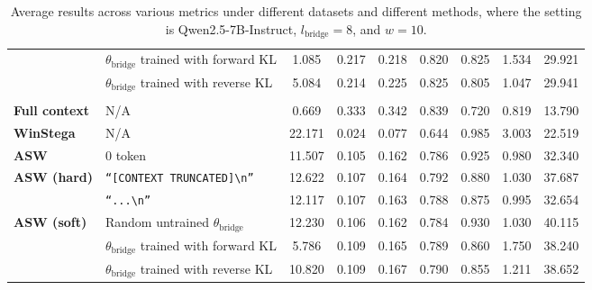\begin{table}[!t]
{\begin{tabular}{l|l|cccc|c|cc}
                        & $\theta_{\text{bridge}}$ trained with forward KL                       &   1.085  &   0.217  &  0.218   &    0.820     &        0.825               &  1.534       &     29.921             \\
                        & $\theta_{\text{bridge}}$ trained with reverse KL                      & 5.084    &  0.214   &  0.225   &    0.825     &     0.805       &     1.047    & 29.941   \\ \hline \rowcolor{blue!8}
\multicolumn{9}{c}{Super-NaturalInstructions~\cite{wang-etal-2022-super}} \\  \hline \rowcolor{gray!20}
\textbf{Full context}            & N/A    &  0.669   &   0.333   &  0.342   &     0.839     &           0.720   &   0.819   & 13.790  \\  \hline
\textbf{WinStega}                & N/A        &   22.171   &  0.024  &  0.077   &    0.644      &            0.985         &   3.003     &   22.519                  \\ \hline
 \textbf{ASW}  & 0 token                            &   11.507   &    0.105   &   0.162   &    0.786       &       0.925       &   0.980     &        32.340             \\ \hline
    \multirow{2}{*}{\textbf{ASW (hard)}}                     & \texttt{``[CONTEXT TRUNCATED]\textbackslash n''}                             &   12.622   &   0.107    &    0.164   &     0.792     &   0.880     &   1.030    &    37.687          \\
                        & \texttt{``...\textbackslash n''}         &   12.117  &  0.107   &  0.163   &    0.788     &            0.875           &   0.995      &     32.654                \\ \cline{1-9}
\multirow{3}{*}{\textbf{ASW (soft)}}   & Random untrained  $\theta_{\text{bridge}}$                           &  12.230   &  0.106   &  0.162   &     0.784    &          0.930             &    1.030     &   40.115               \\
                        & $\theta_{\text{bridge}}$ trained with forward KL                       &   5.786  &  0.109   &  0.165   &   0.789      &    0.860     &   1.750      &    38.240              \\
                        & $\theta_{\text{bridge}}$ trained with reverse KL          &  10.820   & 0.109    &  0.167   &    0.790     &          0.855             &     1.211    &  38.652  \\  \bottomrule[1pt]
\end{tabular}}
 \caption{Average results across various metrics under different datasets and different methods, where the setting is Qwen2.5-7B-Instruct, $l_{\text{bridge}} = 8$, and $w = 10$.}
 \label{table: Effect of dataset}
\end{table}

